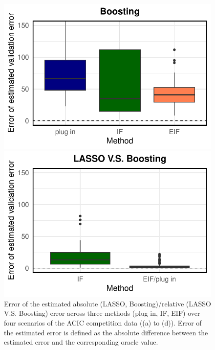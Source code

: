 \begin{figure}[ht]
\begin{minipage}{0.3\textwidth}
                \includegraphics[clip, trim = 0cm 0cm 0cm 0cm, width = \textwidth]{plot/ACIC_nonlinear_propensity_nonlinear_HTE_estimator_error_Boosting.pdf}
        \end{minipage}
        \begin{minipage}{0.3\textwidth}
                \centering
                \includegraphics[clip, trim = 0cm 0cm 0cm 0cm, width = \textwidth]{plot/ACIC_nonlinear_propensity_nonlinear_HTE_estimator_error_LASSO_V.S._Boosting.pdf}
        \end{minipage}        
        \caption{
        Error of the estimated absolute (LASSO, Boosting)/relative (LASSO V.S. Boosting) error across three methods (plug in, IF, EIF) over four scenarios of the ACIC competition data ((a) to (d)). 
        Error of the estimated error is defined as the absolute difference between the estimated error and the corresponding oracle value.
        }
    \label{fig:ACIC.error.estimated.error}
\end{figure}





